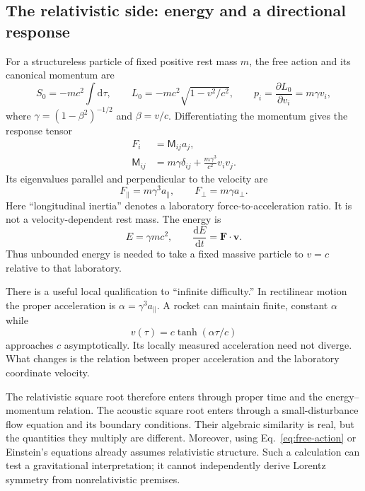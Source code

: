 \documentclass[11pt,a4paper]{article}
\numberwithin{equation}{section}
\newcommand{\dd}{\mathrm{d}}
\begin{document}
\subsection{The relativistic side: energy and a directional response}

For a structureless particle of fixed positive rest mass $m$, the free action and its canonical momentum are
\begin{equation}
 S_0=-mc^2\int\dd\tau,
 \qquad L_0=-mc^2\sqrt{1-v^2/c^2},
 \qquad p_i=\frac{\partial L_0}{\partial v_i}=m\gamma v_i,
 \label{eq:free-action}
\end{equation}
where $\gamma=(1-\beta^2)^{-1/2}$ and $\beta=v/c$. Differentiating the momentum gives the response tensor
\begin{align}
 F_i&=\mathsf{M}_{ij}a_j,\\
 \mathsf{M}_{ij}
 &=m\gamma\delta_{ij}+\frac{m\gamma^3}{c^2}v_i v_j.
 \label{eq:mass-tensor}
\end{align}
Its eigenvalues parallel and perpendicular to the velocity are
\begin{equation}
 \boxed{F_\parallel=m\gamma^3a_\parallel,\qquad
 F_\perp=m\gamma a_\perp.}
 \label{eq:inertia}
\end{equation}
Here ``longitudinal inertia'' denotes a laboratory force-to-acceleration ratio. It is not a velocity-dependent rest mass. The energy is
\begin{equation}
 E=\gamma mc^2,\qquad
 \frac{\dd E}{\dd t}=\bm F\cdot\bm v.
 \label{eq:energy}
\end{equation}
Thus unbounded energy is needed to take a fixed massive particle to $v=c$ relative to that laboratory.

There is a useful local qualification to ``infinite difficulty.'' In rectilinear motion the proper acceleration is $\alpha=\gamma^3a_\parallel$. A rocket can maintain finite, constant $\alpha$ while
\begin{equation}
 v(\tau)=c\tanh(\alpha\tau/c)
 \label{eq:proper-acceleration}
\end{equation}
approaches $c$ asymptotically. Its locally measured acceleration need not diverge. What changes is the relation between proper acceleration and the laboratory coordinate velocity.

The relativistic square root therefore enters through proper time and the energy--momentum relation. The acoustic square root enters through a small-disturbance flow equation and its boundary conditions. Their algebraic similarity is real, but the quantities they multiply are different. Moreover, using Eq.~\eqref{eq:free-action} or Einstein's equations already assumes relativistic structure. Such a calculation can test a gravitational interpretation; it cannot independently derive Lorentz symmetry from nonrelativistic premises.
\end{document}
